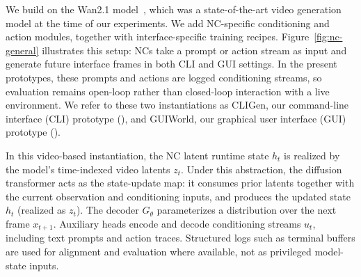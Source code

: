 We build on the Wan2.1 model~\citep{wan2025wan}, which was a state-of-the-art video generation model at the time of our experiments.
We add NC-specific conditioning and action modules, together with interface-specific training recipes.
Figure~\ref{fig:nc-general} illustrates this setup: NCs take a prompt or action stream as input and generate future interface frames in both CLI and GUI settings. In the present prototypes, these prompts and actions are logged conditioning streams, so evaluation remains open-loop rather than closed-loop interaction with a live environment.
We refer to these two instantiations as CLIGen, our command-line interface (CLI) prototype (), and GUIWorld, our graphical user interface (GUI) prototype ().

In this video-based instantiation, the NC latent runtime state $h_t$ is realized by the model’s time-indexed video latents $z_t$.
Under this abstraction, the diffusion transformer acts as the state-update map: it consumes prior latents together with the current observation and conditioning inputs, and produces the updated state $h_t$ (realized as $z_t$).
The decoder $G_\theta$ parameterizes a distribution over the next frame $x_{t+1}$.
Auxiliary heads encode and decode conditioning streams $u_t$, including text prompts and action traces.
Structured logs such as terminal buffers are used for alignment and evaluation where available, not as privileged model-state inputs.
